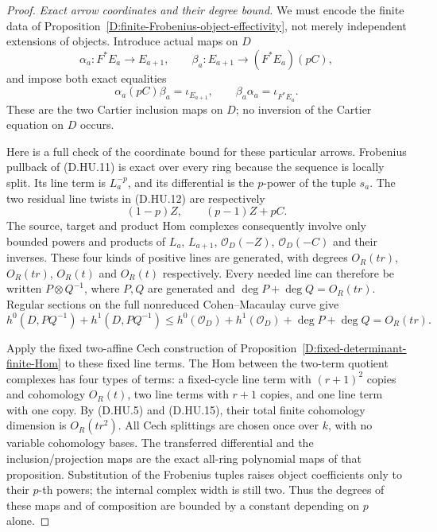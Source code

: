 \begin{proof}
\emph{Exact arrow coordinates and their degree bound.}
We must encode the finite data of
Proposition~\ref{D:finite-Frobenius-object-effectivity},
not merely independent extensions of objects. Introduce
actual maps on $D$
\[
 \alpha_a:F^*E_a\to E_{a+1},\qquad
 \beta_a:E_{a+1}\to(F^*E_a)(pC),                         \tag{D.HU.12}
\]
and impose both exact equalities
\[
 \alpha_a(pC)\beta_a=\iota_{E_{a+1}},\qquad
 \beta_a\alpha_a=\iota_{F^*E_a}.                         \tag{D.HU.13}
\]
These are the two Cartier inclusion maps on $D$; no
inversion of the Cartier equation on $D$ occurs.

Here is a full check of the coordinate bound for these
particular arrows. Frobenius pullback of (D.HU.11) is
exact over every ring because the sequence is locally
split. Its line term is $L_a^{-p}$, and its differential
is the $p$-power of the tuple $s_a$. The two residual
line twists in (D.HU.12) are respectively
\[
                    (1-p)Z,\qquad(p-1)Z+pC.              \tag{D.HU.14}
\]
The source, target and product Hom complexes consequently
involve only bounded powers and products of
$L_a$, $L_{a+1}$, $\mathcal O_D(-Z)$,
$\mathcal O_D(-C)$ and their inverses. These four kinds
of positive lines are generated, with degrees $O_R(tr)$,
$O_R(tr)$, $O_R(t)$ and $O_R(t)$ respectively.
Every needed line can therefore be written $P\otimes Q^{-1}$,
where $P,Q$ are generated and
$\deg P+\deg Q=O_R(tr)$.
Regular sections on the full nonreduced Cohen--Macaulay
curve give
\[
 h^0(D,PQ^{-1})+h^1(D,PQ^{-1})
 \le h^0(\mathcal O_D)+h^1(\mathcal O_D)+\deg P+\deg Q
                                  =O_R(tr).             \tag{D.HU.15}
\]

Apply the fixed two-affine Cech construction of
Proposition~\ref{D:fixed-determinant-finite-Hom} to these
fixed line terms. The Hom between the two-term quotient
complexes has four types of terms: a fixed-cycle line term with
$(r+1)^2$ copies and cohomology $O_R(t)$, two line terms with $r+1$ copies, and
one line term with one copy. By (D.HU.5) and (D.HU.15),
their total finite cohomology dimension is $O_R(tr^2)$.
All Cech splittings are chosen once over $k$, with no
variable cohomology bases. The transferred differential
and the inclusion/projection maps are the exact
all-ring polynomial maps of that proposition.
Substitution of the Frobenius tuples raises object
coefficients only to their $p$-th powers; the internal
complex width is still two. Thus the degrees of these
maps and of composition are bounded by a constant
depending on $p$ alone.


\end{proof}
